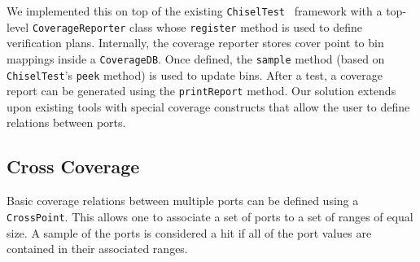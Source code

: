 \documentclass[conference]{IEEEtran}
\begin{document}
We implemented this on top of the existing \texttt{ChiselTest}~\cite{chisel:tester2} framework with a top-level \texttt{CoverageReporter} class whose \texttt{register} method is used to define verification plans. Internally, the coverage reporter stores cover point to bin mappings inside a \texttt{CoverageDB}. Once defined, the \texttt{sample} method (based on \texttt{ChiselTest}'s \texttt{peek} method) is used to update bins. After a test, a coverage report can be generated using the \texttt{printReport} method. Our solution extends upon existing tools with special coverage constructs that allow the user to define relations between ports. %

\subsection{Cross Coverage}
Basic coverage relations between multiple ports can be defined using a \texttt{CrossPoint}. 
This allows one to associate a set of ports to a set of ranges of equal size.  
A sample of the ports is considered a hit if all of the port values are contained in their associated ranges. %
\end{document}
